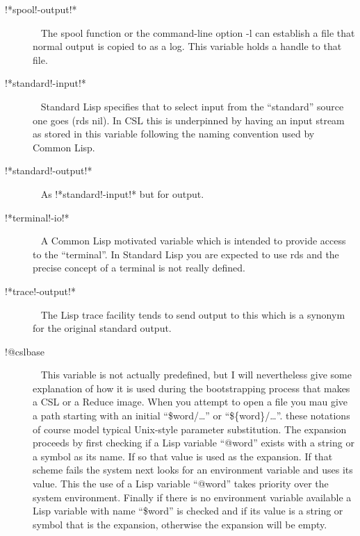 \documentclass[a4paper,11pt]{article}
\begin{document}
\begin{description}
\item [{\ttfamily !*spool!-output!*}]  ~\newline
The {\ttfamily spool} function or the command-line option {\ttfamily -l}
can establish a file that normal output is copied to as a log. This variable
holds a handle to that file.

\item [{\ttfamily !*standard!-input!*}]  ~\newline
Standard Lisp specifies that to select input from the ``standard'' source
one goes {\ttfamily (rds nil)}. In CSL this is underpinned by having an
input stream as stored in this variable following the naming convention used
by Common Lisp.

\item [{\ttfamily !*standard!-output!*}]  ~\newline
As {\ttfamily !*standard!-input!*} but for output.

\item [{\ttfamily !*terminal!-io!*}]  ~\newline
A Common Lisp motivated variable which is intended to provide access to
the ``terminal''. In Standard Lisp you are expected to use {\ttfamily rds}
and the precise concept of a terminal is not really defined.

\item [{\ttfamily !*trace!-output!*}]  ~\newline
The Lisp trace facility tends to send output to this which is a synonym
for the original standard output.

\item [{\ttfamily !@cslbase}]  ~\newline
This variable is not actually predefined, but I will nevertheless give some
explanation of how it is used during the bootstrapping process that makes
a CSL or a Reduce image. When you attempt to open a file you mau give
a path starting with an initial ``\$word/\ldots'' or ``\$\{word\}/\ldots''.
these notations of course model typical Unix-style parameter substitution.
The expansion proceeds by first checking if a Lisp variable ``@word''
exists with a string or a symbol as its name. If so that value is used
as the expansion. If that scheme fails the system next looks for an
environment variable and uses its value. This the use of a Lisp variable
``@word'' takes priority over the system environment. Finally if there is
no environment variable available a Lisp variable with name ``\$word'' is
checked and if its value is a string or symbol that is the expansion,
otherwise the expansion will be empty.
  

\end{description}
\end{document}
